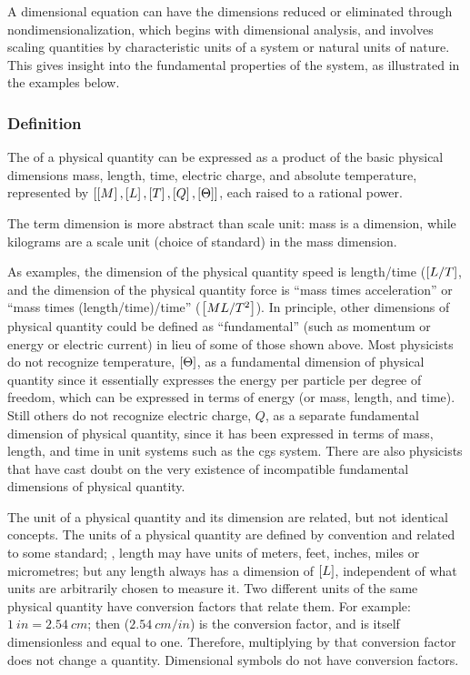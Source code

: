 A dimensional equation can have the dimensions reduced or eliminated through nondimensionalization, which begins with dimensional analysis, and involves scaling quantities by characteristic units of a system or natural units of nature. This gives insight into the fundamental properties of the system, as illustrated in the examples below.


\subsubsection{Definition}
The  of a physical quantity can be expressed as a product of the basic physical dimensions mass, length, time, electric charge, and absolute temperature, represented by  $\left[{\left[{M}\right], \left[{L}\right], \left[{T}\right], \left[{Q}\right], \left[{\Theta}\right]}\right]$, each raised to a rational power.

The term dimension is more abstract than scale unit: mass is a dimension, while kilograms are a scale unit (choice of standard) in the mass dimension.

As examples, the dimension of the physical quantity speed is length/time ($\left[{L/T}\right]$, and the dimension of the physical quantity force is ``mass times acceleration'' or ``mass times (length/time)/time'' ($\left[{ML/T^2}\right]$). In principle, other dimensions of physical quantity could be defined as ``fundamental'' (such as momentum or energy or electric current) in lieu of some of those shown above. Most physicists do not recognize temperature, $\left[{\Theta}\right]$, as a fundamental dimension of physical quantity since it essentially expresses the energy per particle per degree of freedom, which can be expressed in terms of energy (or mass, length, and time). Still others do not recognize electric charge, $Q$, as a separate fundamental dimension of physical quantity, since it has been expressed in terms of mass, length, and time in unit systems such as the cgs system. There are also physicists that have cast doubt on the very existence of incompatible fundamental dimensions of physical quantity.

The unit of a physical quantity and its dimension are related, but not identical concepts. The units of a physical quantity are defined by convention and related to some standard; \eg, length may have units of meters, feet, inches, miles or micrometres; but any length always has a dimension of $\left[{L}\right]$, independent of what units are arbitrarily chosen to measure it. Two different units of the same physical quantity have conversion factors that relate them. For example: $\SI{1}{in} = \SI{2.54}{cm}$; then ($\SI{2.54}{cm/in}$) is the conversion factor, and is itself dimensionless and equal to one. Therefore, multiplying by that conversion factor does not change a quantity. Dimensional symbols do not have conversion factors.


